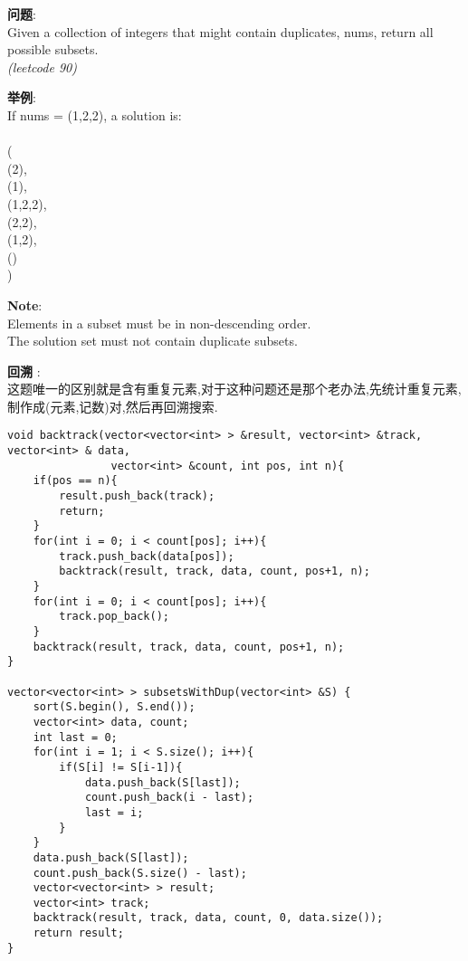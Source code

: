     
\begin{description}
    \item{\textbf{问题}}:\\
Given a collection of integers that might contain duplicates, nums, return all possible subsets.\\
\textit{(leetcode 90)}
    \item{\textbf{举例}}:\\
If nums = (1,2,2), a solution is:\\
\\
(\\
  (2),\\
  (1),\\
  (1,2,2),\\
  (2,2),\\
  (1,2),\\
  ()\\
)
    \item{\textbf{Note}}:\\
Elements in a subset must be in non-descending order.\\
The solution set must not contain duplicate subsets.\\
    \item{\textbf{回溯}} : 
    \\这题唯一的区别就是含有重复元素,对于这种问题还是那个老办法,先统计重复元素,制作成(元素,记数)对,然后再回溯搜索.
    \begin{lstlisting}
void backtrack(vector<vector<int> > &result, vector<int> &track, vector<int> & data,
				vector<int> &count, int pos, int n){
	if(pos == n){
		result.push_back(track);
		return;
	}
	for(int i = 0; i < count[pos]; i++){
		track.push_back(data[pos]);
		backtrack(result, track, data, count, pos+1, n);
	}
	for(int i = 0; i < count[pos]; i++){
		track.pop_back();
	}
	backtrack(result, track, data, count, pos+1, n);
}

vector<vector<int> > subsetsWithDup(vector<int> &S) {
	sort(S.begin(), S.end());
	vector<int> data, count;
	int last = 0;
	for(int i = 1; i < S.size(); i++){
		if(S[i] != S[i-1]){
			data.push_back(S[last]);
			count.push_back(i - last);
			last = i;
		}
	}
	data.push_back(S[last]);
	count.push_back(S.size() - last);
	vector<vector<int> > result;
	vector<int> track;
	backtrack(result, track, data, count, 0, data.size());
	return result;
}
    \end{lstlisting}
\end{description}
